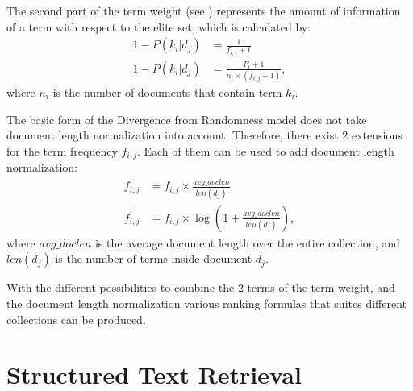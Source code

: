 The second part of the term weight (see ) represents the amount of information of a term with respect to the elite set, which is calculated by:
\begin{align}
  1 - P(k_i | d_j) & = \frac{1}{f_{i, j} + 1} \\
  1 - P(k_i | d_j) & = \frac{F_i + 1}{n_i \times (f_{i, j} + 1)},
\end{align}
where $n_i$ is the number of documents that contain term $k_i$.

The basic form of the Divergence from Randomness model does not take document length normalization into account. Therefore, there exist 2 extensions for the term frequency $f_{i, j}$. Each of them can be used to add document length normalization:
\begin{align}
  f^{\prime}_{i, j} & = f_{i, j} \times \frac{avg\_doclen}{len(d_j)} \\
  f^{\prime}_{i, j} & = f_{i, j} \times \log \left(1 + \frac{avg\_doclen}{len(d_j)} \right),
\end{align}
where $avg\_doclen$ is the average document length over the entire collection, and $len(d_j)$ is the number of terms inside document $d_j$.

With the different possibilities to combine the $2$ terms of the term weight, and the document length normalization various ranking formulas that suites different collections can be produced.

\section{Structured Text Retrieval}
\label{sec:structured_text_Retrieval}

